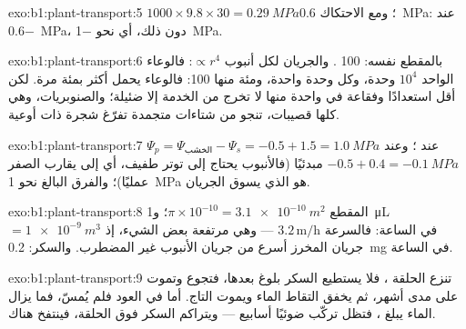 \begin{solution}{exo:b1:plant-transport:5}
$1000\times 9.8\times 30 = \qty{0.29}{MPa}$؛ ومع الاحتكاك
\qty{0.6}{MPa}:  عند \qty{-0.6}{MPa}،  دون ذلك، أي
نحو \qty{-1}{MPa}.
\end{solution}

\begin{solution}{exo:b1:plant-transport:6}
بالمقطع نفسه: 100 . والجريان لكل أنبوب $\propto r^4$: فالوعاء
الواحد $10^4$ وحدة، وكل  وحدة واحدة، ومئة منها 100: فالوعاء
يحمل أكثر بمئة مرة. لكن  أقل استعدادًا  وفقاعة في
واحدة منها لا تخرج من الخدمة إلا  ضئيلة؛ والصنوبريات، وهي كلها
قصيبات، تنجو من شتاءات متجمدة تفرّغ  شجرة ذات أوعية.
\end{solution}

\begin{solution}{exo:b1:plant-transport:7}
$\Psi_p = \Psi_{\text{الخشب}} - \Psi_s = -0.5 + 1.5 = \qty{1.0}{MPa}$
عند ؛ وعند  $-0.5 + 0.4 = \qty{-0.1}{MPa}$ مبدئيًا
(فالأنبوب يحتاج إلى توتر طفيف، أي إلى  يقارب الصفر عمليًا)؛
والفرق البالغ نحو \qty{1}{MPa} هو الذي يسوق الجريان.
\end{solution}

\begin{solution}{exo:b1:plant-transport:8}
المقطع $\pi\times 10^{-10} = \qty{3.1e-10}{m^2}$؛ و\qty{1}{\micro L}
$= \qty{1e-9}{m^3}$ في الساعة: فالسرعة $3.2\,\mathrm{m/h}$ --- وهي
مرتفعة بعض الشيء، إذ جريان المخرز أسرع من جريان الأنبوب غير
المضطرب. والسكر: \qty{0.2}{mg} في الساعة.
\end{solution}

\begin{solution}{exo:b1:plant-transport:9}
تنزع الحلقة ، فلا يستطيع السكر بلوغ  بعدها، فتجوع وتموت
على مدى أشهر، ثم يخفق التقاط الماء ويموت التاج. أما  في العود
فلم يُمسّ، فما يزال الماء يبلغ ، فتظل تركّب ضوئيًا أسابيع
--- ويتراكم السكر فوق الحلقة، فينتفخ  هناك.
\end{solution}

